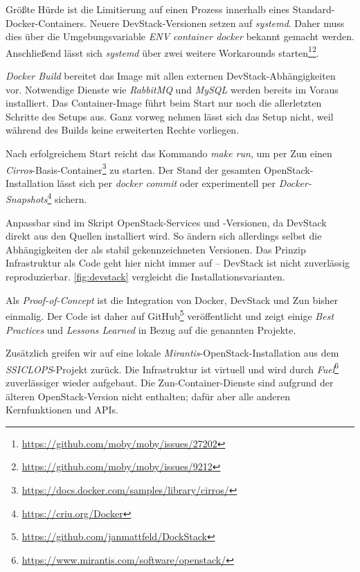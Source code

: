 Größte Hürde ist die Limitierung auf einen Prozess innerhalb eines Standard-Docker-Containers. Neuere DevStack-Versionen setzen auf \emph{systemd}. Daher muss dies über die Umgebungsvariable \emph{ENV container docker} bekannt gemacht werden. Anschließend lässt sich \emph{systemd} über zwei weitere Workarounds starten\footnote{\url{https://github.com/moby/moby/issues/27202}}\footnote{\url{https://github.com/moby/moby/issues/9212}}.

\emph{Docker Build} bereitet das Image mit allen externen DevStack-Abhängigkeiten vor. Notwendige Dienste wie \emph{RabbitMQ} und \emph{MySQL} werden bereits im Voraus installiert. Das Container-Image führt beim Start nur noch die allerletzten Schritte des Setups aus. Ganz vorweg nehmen lässt sich das Setup nicht, weil während des Builds keine erweiterten Rechte vorliegen.

Nach erfolgreichem Start reicht das Kommando \emph{make run}, um per Zun einen \emph{Cirros}-Basis-Container\footnote{\url{https://docs.docker.com/samples/library/cirros/}} zu starten. Der Stand der gesamten OpenStack-Installation lässt sich per \emph{docker commit} oder experimentell per \emph{Docker-Snapshots}\footnote{\url{https://criu.org/Docker}} sichern.

Anpassbar sind im Skript OpenStack-Services und -Versionen, da DevStack direkt aus den Quellen installiert wird. So ändern sich allerdings selbst die Abhängigkeiten der als stabil gekennzeichneten Versionen. Das Prinzip Infrastruktur als Code geht hier nicht immer auf -- DevStack ist nicht zuverlässig reproduzierbar. \autoref{fig:devstack} vergleicht die Installationsvarianten.

Als \emph{Proof-of-Concept} ist die Integration von Docker, DevStack und Zun bisher einmalig. Der Code ist daher auf GitHub\footnote{\url{https://github.com/janmattfeld/DockStack}} veröffentlicht und zeigt einige \emph{Best Practices} und \emph{Lessons Learned} in Bezug auf die genannten Projekte.

Zusätzlich greifen wir auf eine lokale \emph{Mirantis}-OpenStack-Installation aus dem \emph{SSICLOPS}-Projekt zurück. Die Infrastruktur ist virtuell und wird durch \emph{Fuel}\footnote{\url{https://www.mirantis.com/software/openstack/}} zuverlässiger wieder aufgebaut. Die Zun-Container-Dienste sind aufgrund der älteren OpenStack-Version nicht enthalten; dafür aber alle anderen Kernfunktionen und APIs.
